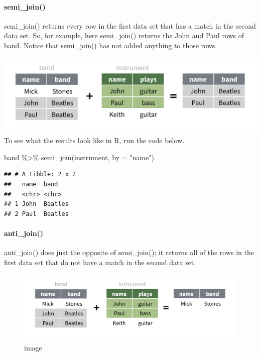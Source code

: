 \documentclass[
]{article}
\newenvironment{Shaded}{\begin{snugshade}}{\end{snugshade}}
\newcommand{\AttributeTok}[1]{\textcolor[rgb]{0.77,0.63,0.00}{#1}}
\newcommand{\FunctionTok}[1]{\textcolor[rgb]{0.00,0.00,0.00}{#1}}
\newcommand{\NormalTok}[1]{#1}
\newcommand{\SpecialCharTok}[1]{\textcolor[rgb]{0.00,0.00,0.00}{#1}}
\newcommand{\StringTok}[1]{\textcolor[rgb]{0.31,0.60,0.02}{#1}}
\begin{document}
\hypertarget{semi_join}{%
\paragraph{semi\_join()}\label{semi_join}}

semi\_join() returns every row in the first data set that has a match in
the second data set. So, for example, here semi\_join() returns the John
and Paul rows of band. Notice that semi\_join() has not added anything
to those rows.

\includegraphics{data/semi-join.png} To see what the results look like
in R, run the code below.

\begin{Shaded}
\begin{Highlighting}[]
\NormalTok{band }\SpecialCharTok{\%\textgreater{}\%} \FunctionTok{semi\_join}\NormalTok{(instrument, }\AttributeTok{by =} \StringTok{"name"}\NormalTok{)}
\end{Highlighting}
\end{Shaded}

\begin{verbatim}
## # A tibble: 2 x 2
##   name  band   
##   <chr> <chr>  
## 1 John  Beatles
## 2 Paul  Beatles
\end{verbatim}

\hypertarget{anti_join}{%
\paragraph{anti\_join()}\label{anti_join}}

anti\_join() does just the opposite of semi\_join(); it returns all of
the rows in the first data set that do not have a match in the second
data set.

\begin{figure}
\centering
\includegraphics{data/anti-join.png}
\caption{image}
\end{figure}
\end{document}
